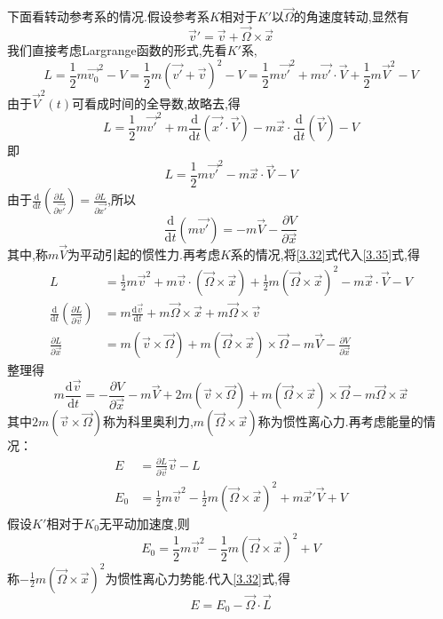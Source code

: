 下面看转动参考系的情况.假设参考系$K$相对于$K'$以$\vec{\Omega}$的角速度转动,显然有
\begin{equation}
\vec{v}' = \vec{v} + \vec{\Omega}\times\vec{x}
\label{3.32}
\end{equation}
我们直接考虑Largrange函数的形式,先看$K'$系,
\begin{equation}
L = \frac{1}{2}m\vec{v_0}^2 - V = \frac{1}{2}m(\vec{v'}+\vec{v})^2 - V
= \frac{1}{2}m\vec{v'}^2 + m\vec{v'}\cdot\vec{V} + \frac{1}{2}m\vec{V}^2 - V
\end{equation}
由于$\vec{V}^2(t)$可看成时间的全导数,故略去,得
\begin{equation}
L = \frac{1}{2}m\vec{v'}^2 + m\frac{\mathrm{d}}{\mathrm{d}t}(\vec{x'}\cdot\vec{V}) - m\vec{x}\cdot \frac{\mathrm{d}}{\mathrm{d}t}(\vec{V}) - V
\end{equation}
即
\begin{equation}
L = \frac{1}{2}m\vec{v'}^2 - m\vec{x}\cdot\vec{V} - V
\label{3.35}
\end{equation}
由于$\frac{\mathrm{d}}{\mathrm{d}t}\left( \frac{\partial L}{\partial\vec{v'}} \right) = 
\frac{\partial L}{\partial \vec{x'}}$,所以
\begin{equation}
\frac{\mathrm{d}}{\mathrm{d}t}(m\vec{v'}) = -m\vec{V} - 
\frac{\partial V}{\partial\vec{x}}
\end{equation}
其中,称$m\vec{V}$为平动引起的惯性力.再考虑$K$系的情况,将\eqref{3.32}式代入\eqref{3.35}式,得
\begin{align}
L & = \frac{1}{2}m\vec{v}^2 + m\vec{v}\cdot(\vec{\Omega}\times\vec{x}) + \frac{1}{2}m(\vec{\Omega}\times\vec{x})^2 - m\vec{x}\cdot\vec{V} - V \\
\frac{\mathrm{d}}{\mathrm{d}t}\left( \frac{\partial L}{\partial\vec{v}} \right) & = 
m\frac{\mathrm{d}\vec{v}}{\mathrm{d}t} + m\vec{\Omega}\times\vec{x} + m\vec{\Omega}\times\vec{v} \\
\frac{\partial L}{\partial\vec{x}} & = m(\vec{v}\times\vec{\Omega}) + m(\vec{\Omega}\times\vec{x})\times\vec{\Omega} - m\vec{V} - \frac{\partial V}{\partial\vec{x}}
\end{align}
整理得
\begin{equation}
m\frac{\mathrm{d}\vec{v}}{\mathrm{d}t} = -\frac{\partial V}{\partial\vec{x}} -m\vec{V} + 
2m(\vec{v}\times\vec{\Omega}) + m(\vec{\Omega}\times\vec{x})\times\vec{\Omega} - m\vec{\Omega}\times\vec{x}
\end{equation}
其中$2m(\vec{v}\times\vec{\Omega})$称为科里奥利力,$m(\vec{\Omega}\times\vec{x})$称为惯性离心力.再考虑能量的情况：
\begin{align}
E & = \frac{\partial L}{\partial\vec{v}}\vec{v} - L\\
E_0 & = \frac{1}{2}m\vec{v}^2 - \frac{1}{2}m(\vec{\Omega}\times\vec{x})^2 + m\vec{x}'\vec{V} + V
\end{align}
假设$K'$相对于$K_0$无平动加速度,则
\begin{equation}
E_0 = \frac{1}{2}m\vec{v}^2 - \frac{1}{2}m(\vec{\Omega}\times\vec{x})^2 + V
\end{equation}
称$-\frac{1}{2}m(\vec{\Omega}\times\vec{x})^2$为惯性离心力势能.代入\eqref{3.32}式,得
\begin{equation}
E = E_0 - \vec{\Omega}\cdot\vec{L}
\end{equation}

